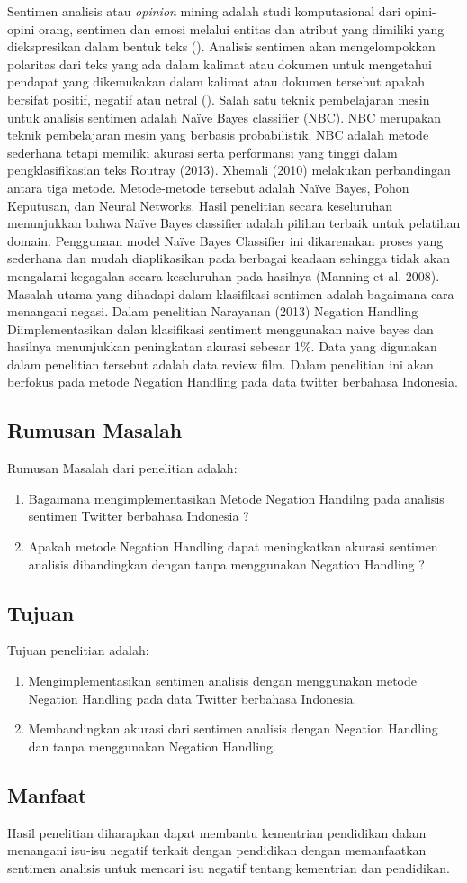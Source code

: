 Sentimen analisis atau \textit{opinion} mining adalah studi komputasional dari opini-opini orang, sentimen dan emosi melalui entitas dan atribut yang dimiliki yang diekspresikan dalam bentuk teks \citeauthor{LIU2012} (\cite*{LIU2012}). Analisis sentimen akan mengelompokkan polaritas dari teks yang ada dalam kalimat atau dokumen untuk mengetahui pendapat yang dikemukakan dalam kalimat atau dokumen tersebut apakah bersifat positif, negatif atau netral (\cite*{PANG2002}). Salah satu teknik pembelajaran mesin untuk analisis sentimen adalah Naïve Bayes classifier (NBC). NBC merupakan teknik pembelajaran mesin yang berbasis probabilistik. NBC adalah metode sederhana tetapi memiliki akurasi serta performansi yang tinggi dalam pengklasifikasian teks Routray (2013). Xhemali (2010) melakukan perbandingan antara tiga metode. Metode-metode tersebut adalah Naïve Bayes, Pohon Keputusan, dan Neural Networks. Hasil penelitian secara keseluruhan menunjukkan bahwa Naïve Bayes classifier adalah pilihan terbaik untuk pelatihan domain. Penggunaan model Naïve Bayes Classifier ini dikarenakan proses yang sederhana dan mudah diaplikasikan pada berbagai keadaan sehingga tidak akan mengalami kegagalan secara keseluruhan pada hasilnya (Manning et al. 2008).
Masalah utama yang dihadapi dalam klasifikasi sentimen adalah bagaimana cara menangani negasi. Dalam penelitian Narayanan (2013) Negation Handling Diimplementasikan dalan klasifikasi sentiment menggunakan naive bayes dan hasilnya menunjukkan peningkatan akurasi sebesar 1\%. Data yang digunakan dalam penelitian tersebut adalah data review film. Dalam penelitian ini akan berfokus pada metode Negation Handling pada data twitter berbahasa Indonesia.



\subsection*{Rumusan Masalah}
Rumusan Masalah dari penelitian adalah:
\begin{enumerate}[noitemsep] 
	\item Bagaimana mengimplementasikan Metode Negation Handilng pada analisis sentimen Twitter berbahasa Indonesia ?
	\item Apakah metode Negation Handling dapat meningkatkan akurasi sentimen analisis dibandingkan dengan tanpa menggunakan Negation Handling ?
\end{enumerate}

\subsection*{Tujuan}
Tujuan penelitian adalah:
\begin{enumerate}[noitemsep] 
	\item Mengimplementasikan sentimen analisis dengan menggunakan metode Negation Handling pada data Twitter berbahasa Indonesia.
	\item Membandingkan akurasi dari sentimen analisis dengan Negation Handling dan tanpa menggunakan Negation Handling.
\end{enumerate}

\subsection*{Manfaat}
Hasil penelitian diharapkan dapat membantu kementrian pendidikan dalam menangani isu-isu negatif terkait dengan pendidikan dengan memanfaatkan sentimen analisis untuk mencari isu negatif tentang kementrian dan pendidikan.
